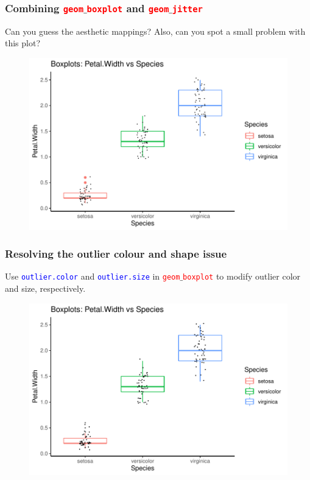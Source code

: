 \documentclass{beamer}
\begin{document}
\begin{frame}\frametitle{Combining \textcolor{red}{\texttt{geom}}$\_$\textcolor{red}{\texttt{boxplot}} and \textcolor{red}{\texttt{geom}}$\_$\textcolor{red}{\texttt{jitter}}}
Can you guess the aesthetic mappings? Also, can you spot a small problem with this plot?
\begin{figure}
\includegraphics[width=0.99\linewidth]{PlotsLec2/GeomBoxJitter}
\end{figure}
\end{frame}

\begin{frame}\frametitle{Resolving the outlier colour and shape issue}
Use \textcolor{blue}{\texttt{outlier.color}} and \textcolor{blue}{\texttt{outlier.size}} in \textcolor{red}{\texttt{geom}}$\_$\textcolor{red}{\texttt{boxplot}} to modify outlier color and size, respectively.
\begin{figure}
\includegraphics[width=0.99\linewidth]{PlotsLec2/GeomBoxJitter2}
\end{figure}
\end{frame}
\end{document}
